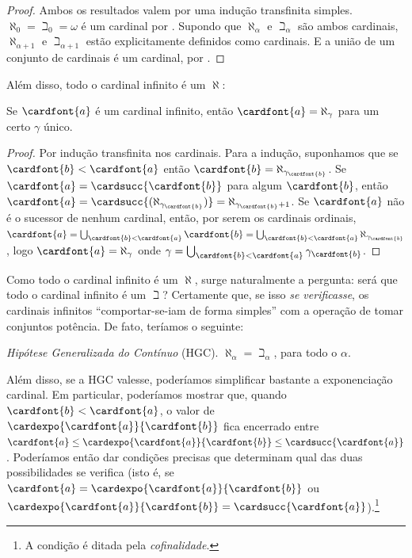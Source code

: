 \documentclass[../../../include/open-logic-section]{subfiles}
\begin{document}
\begin{proof}
Ambos os resultados valem por uma indução transfinita simples. $\aleph_0 =
\beth_0 = \omega$ é um cardinal por
. Supondo que $\aleph_\alpha$ e
$\beth_\alpha$ são ambos cardinais, $\aleph_{\alpha+1}$ e
$\beth_{\alpha+1}$ estão explicitamente definidos como cardinais. E a união
de um conjunto de cardinais é um cardinal, por
.
\end{proof}
\noindent
Além disso, todo o cardinal infinito é um $\aleph$:

\begin{prop}
Se $\cardfont{a}$ é um cardinal infinito, então $\cardfont{a} =
\aleph_\gamma$ para um certo $\gamma$ único.
\end{prop}

\begin{proof}
Por indução transfinita nos cardinais. Para a indução, suponhamos que se
$\cardfont{b} < \cardfont{a}$ então $\cardfont{b} =
\aleph_{\gamma_\cardfont{b}}$. Se $\cardfont{a} =
\cardsucc{\cardfont{b}}$ para algum $\cardfont{b}$, então $\cardfont{a} =
\cardsucc{(\aleph_{\gamma_\cardfont{b}})}=
\aleph_{\gamma_\cardfont{b}+1}$. Se $\cardfont{a}$ não é o
sucessor de nenhum cardinal, então, por serem os cardinais ordinais,
$\cardfont{a} = \bigcup_{\cardfont{b} < \cardfont{a}} \cardfont{b} =
\bigcup_{\cardfont{b} < \cardfont{a}}{\aleph_{\gamma_\cardfont{b}}}$,
logo $\cardfont{a} = \aleph_\gamma$ onde $\gamma =
\bigcup_{\cardfont{b} < \cardfont{a}}\gamma_\cardfont{b}$. 
\end{proof}

Como todo o cardinal infinito é um $\aleph$, surge naturalmente a pergunta:
será que todo o cardinal infinito é um $\beth$? Certamente que, se isso \emph{se verificasse},
os cardinais infinitos ``comportar-se-iam de forma simples''
com a operação de tomar conjuntos potência. De fato, teríamos o seguinte:

\begin{defish}
\emph{Hipótese Generalizada do Contínuo} (HGC). $\aleph_\alpha  = \beth_\alpha$, para todo o $\alpha$. 
\end{defish}

Além disso, se a HGC valesse, poderíamos simplificar bastante a exponenciação cardinal. Em particular, poderíamos
mostrar que, quando $\cardfont{b} < \cardfont{a}$, o valor de
$\cardexpo{\cardfont{a}}{\cardfont{b}}$ fica encerrado entre
$\cardfont{a}\leq \cardexpo{\cardfont{a}}{\cardfont{b}} \leq
\cardsucc{\cardfont{a}}$. Poderíamos então dar condições precisas
que determinam qual das duas possibilidades se verifica
(isto é, se $\cardfont{a} = \cardexpo{\cardfont{a}}{\cardfont{b}}$
ou $\cardexpo{\cardfont{a}}{\cardfont{b}} =
\cardsucc{\cardfont{a}}$).\footnote{A condição é ditada pela
\emph{cofinalidade}.}
\end{document}
